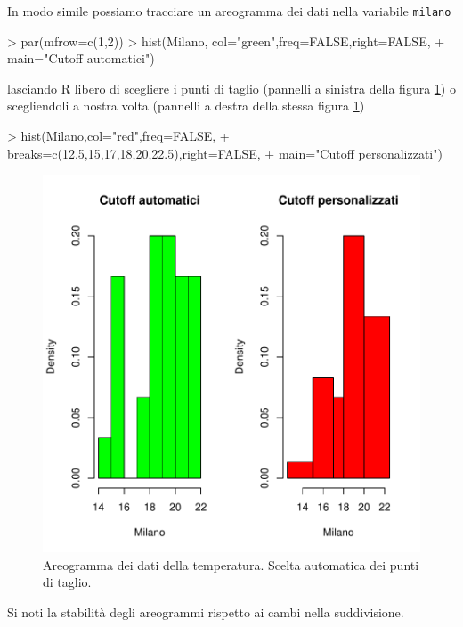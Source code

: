 \documentclass[onecolumn,11pt]{book}
\begin{document}
In modo simile possiamo tracciare un areogramma  dei dati nella variabile \texttt{milano}  
\begin{Schunk}
\begin{Sinput}
> par(mfrow=c(1,2))
> hist(Milano, col="green",freq=FALSE,right=FALSE,
+ main="Cutoff automatici")
\end{Sinput}
\end{Schunk}
lasciando \textsf{R} libero di scegliere i punti di taglio (pannelli a sinistra della figura \ref{fig:datiistmilano}) o scegliendoli a nostra volta (pannelli a destra della stessa figura  \ref{fig:datiistmilano})
\begin{Schunk}
\begin{Sinput}
> hist(Milano,col="red",freq=FALSE,
+ breaks=c(12.5,15,17,18,20,22.5),right=FALSE, 
+ main="Cutoff personalizzati")
\end{Sinput}
\end{Schunk}
\begin{figure}[htbp]
\begin{center}
\includegraphics{statisticaconR-166}
\caption{ Areogramma dei dati della temperatura. Scelta automatica dei punti di taglio.}
\label{fig:datiistmilano}
\end{center}
\end{figure}
Si noti la stabilit\`a degli areogrammi rispetto ai cambi nella suddivisione.
\end{document}

